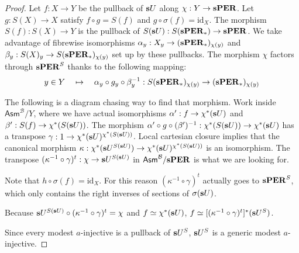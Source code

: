\documentclass{amsart}
\theoremstyle{plain}
\theoremstyle{definition}
\newcommand\hide[1]{}
\newcommand\cat\mathcal
\newcommand\set[1]{\left\{#1\right\}}
\newcommand\id{\mathrm{id}}
\newcommand\ri{^*}
\newcommand\Asm{\mathsf{Asm}}
\begin{document}
\begin{proof}
Let $f:X\to Y$ be the pullback of $\mathbf{s} U$ along $\chi:Y\to \mathbf{s} \mathbf{PER}$. Let $g:S(X) \to X$ satisfy $f\circ g = S(f)$ and $g\circ \sigma(f) = \id_X$. The morphism $S(f):S(X)\to Y$ is the pullback of $S(\mathbf{s} U):S(\mathbf{s}\mathbf{PER}_*) \to \mathbf{s}\mathbf{PER}$. We take advantage of fibrewise isomorphisms $\alpha_y:X_y \to (\mathbf{s}\mathbf{PER}_*)_{\chi(y)}$ and $\beta_y:S(X)_y\to S(\mathbf{s}\mathbf{PER}_*)_{\chi(y)}$ set up by these pullbacks. The morphism $\chi$ factors through $\mathbf{s}\mathbf{PER}^S$ thanks to the following mapping: 
\[ y\in Y \quad \mapsto \quad \alpha_y\circ g_y\circ \beta_y^{-1}:S(\mathbf{s}\mathbf{PER}_*)_{\chi(y)}\to (\mathbf{s}\mathbf{PER}_*)_{\chi(y)} \]

\hide{generalized elements}
The following is a diagram chasing way to find that morphism.
Work inside $\Asm^{\cat B}/Y$, where we have actual isomorphisms $\alpha':f\to \chi\ri(\rat U)$ and $\beta':S(f)\to\chi\ri(S(\rat U))$. 
The morphism $\alpha'\circ g\circ (\beta')^{-1}:\chi\ri(S(\rat U)) \to \chi\ri(\rat U)$ has a transpose $\gamma:1\to \chi\ri(\rat U)^{\chi\ri(S(\rat U))}$. 
Local cartesian closure implies that the canonical morphism $\kappa:\chi\ri(\rat U^{S(\rat U)})\to \chi\ri(\rat U)^{\chi\ri(S(\rat U))}$ is an isomorphism.
The transpose $(\kappa^{-1}\circ\gamma)^t:\chi\to \mathbf{s} U^{S(\mathbf{s} U)}$ in $\Asm^{\cat B}/\rat\pers$ is what we are looking for.

Note that $h\circ \sigma(f) = \id_X$. For this reason $(\kappa^{-1}\circ\gamma)^t$ actually goes to $\mathbf{s}\mathbf{PER}^S$, which only contains the right inverses of sections of $\sigma(\mathbf{s} U)$.
\hide{Kunnen we vast aantonen met de juiste pullbacks, maar misschien gaat dat te ver.}

Because $\mathbf{s} U^{S(\mathbf{s} U)}\circ (\kappa^{-1}\circ\gamma)^t = \chi$ and $f\simeq \chi\ri(\rat U)$, $f\simeq [(\kappa^{-1}\circ\gamma)^t]\ri(\rat U^S)$. 

Since every modest $a$-injective is a pullback of $\mathbf{s} U^S$, $\mathbf{s} U^S$ is a generic modest $a$-injective. %
\end{proof}

\end{document}
